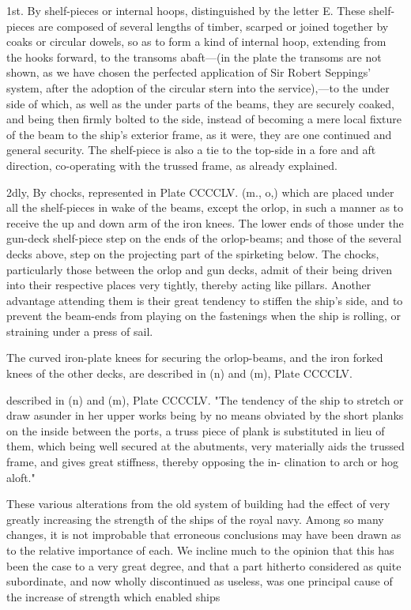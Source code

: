 \documentclass{article}
\begin{document}
1st. By shelf-pieces or internal hoops, distinguished by the letter E. These shelf-pieces are composed of several lengths of timber, scarped or joined together by coaks or circular dowels, so as to form a kind of internal hoop, extending from the hooks forward, to the transoms abaft—(in the plate the transoms are not shown, as we have chosen the perfected application of Sir Robert Seppings' system, after the adoption of the circular stern into the service),—to the under side of which, as well as the under parts of the beams, they are securely coaked, and being then firmly bolted to the side, instead of becoming a mere local fixture of the beam to the ship's exterior frame, as it were, they are one continued and general security. The shelf-piece is also a tie to the top-side in a fore and aft direction, co-operating with the trussed frame, as already explained.

2dly, By chocks, represented in Plate CCCCLV. (m., o,) which are placed under all the shelf-pieces in wake of the beams, except the orlop, in such a manner as to receive the up and down arm of the iron knees. The lower ends of those under the gun-deck shelf-piece step on the ends of the orlop-beams; and those of the several decks above, step on the projecting part of the spirketing below. The chocks, particularly those between the orlop and gun decks, admit of their being driven into their respective places very tightly, thereby acting like pillars. Another advantage attending them is their great tendency to stiffen the ship's side, and to prevent the beam-ends from playing on the fastenings when the ship is rolling, or straining under a press of sail.

The curved iron-plate knees for securing the orlop-beams, and the iron forked knees of the other decks, are described in (n) and (m), Plate CCCCLV.

described in (n) and (m), Plate CCCCLV.
"The tendency of the ship to stretch or draw asunder
in her upper works being by no means obviated by the
short planks on the inside between the ports, a truss piece
of plank is substituted in lieu of them, which being well
secured at the abutments, very materially aids the trussed
frame, and gives great stiffness, thereby opposing the in-
clination to arch or hog aloft."

These various alterations from the old system of building had the effect of very greatly increasing the strength of the ships of the royal navy. Among so many changes, it is not improbable that erroneous conclusions may have been drawn as to the relative importance of each. We incline much to the opinion that this has been the case to a very great degree, and that a part hitherto considered as quite subordinate, and now wholly discontinued as useless, was one principal cause of the increase of strength which enabled ships
\end{document}
